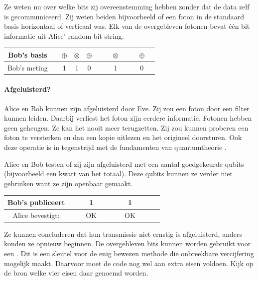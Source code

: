 \documentclass[../../main.tex]{subfiles}
\begin{document}
Ze weten nu over welke bits zij overeenstemming hebben zonder dat de data zelf is gecommuniceerd. Zij weten beiden bijvoorbeeld of een foton in de standaard basis horizontaal of verticaal was. Elk van de overgebleven fotonen bevat \'e\'en bit informatie uit Alice' random bit string.

\vspace*{12pt}
{\footnotesize
\begin{tabular}{c|c|c|c|c|c|c|c|c|c|c|c|}
Bob's basis & &$\oplus$&$\otimes$&$\oplus$& & &$\otimes$& & &$\oplus$\\\hline 
Bob's meting& &1&1&0& & &1& & &0
\end{tabular}
}

\paragraph{Afgeluisterd?}
Alice en Bob kunnen zijn afgeluisterd door Eve. Zij zou een foton door een filter kunnen leiden. Daarbij verliest het foton zijn eerdere informatie. Fotonen hebben geen geheugen. Ze kan het nooit meer terugzetten. Zij zou kunnen proberen een foton te versterken en dan een kopie uitlezen en het origineel doorsturen. Ook deze operatie is in tegenstrijd met de fundamenten van quantumtheorie \citep{wootters1982single}.

Alice en Bob testen of zij zijn afgeluisterd met een aantal goedgekeurde qubits (bijvoorbeeld een kwart van het totaal). Deze qubits kunnen ze verder niet gebruiken want ze zijn openbaar gemaakt.

\vspace*{12pt}
{\footnotesize
\begin{tabular}{c|c|c|c|c|c|c|c|c|c|c|}
Bob's publiceert  & & &1& & & &1& & & \\\hline 
Alice bevestigt:  & & &OK& & & &OK& & &
\end{tabular}
}
\vspace*{12pt}

Ze kunnen concluderen dat hun transmissie niet ernstig is afgeluisterd, anders konden ze opnieuw beginnen. De overgebleven bits kunnen worden gebruikt voor een . Dit is een sleutel voor de enig bewezen methode die onbreekbare vercijfering mogelijk maakt. Daarvoor moet de code nog wel aan extra eisen voldoen. Kijk op de bron welke vier eisen daar genoemd worden. 
\end{document}
